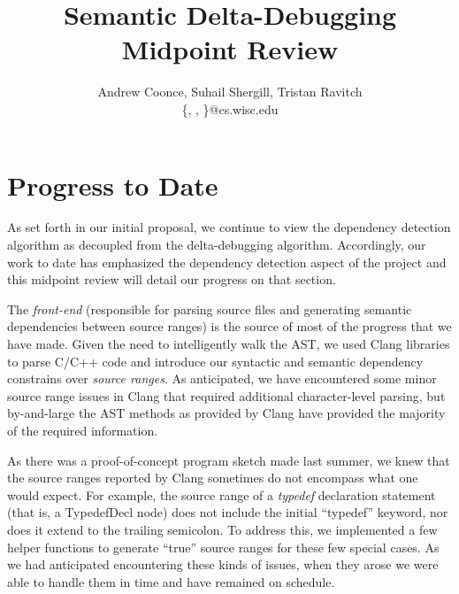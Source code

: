 \documentclass[11pt]{article}
\title{Semantic Delta-Debugging\\
Midpoint Review}
\author{Andrew Coonce, Suhail Shergill, Tristan Ravitch \\
\{\mailto{coonce}, \mailto{shergill}, \mailto{travitch}\}@cs.wisc.edu
}
\begin{document}
\maketitle

\section{Progress to Date}
As set forth in our initial proposal, we continue to view the dependency
detection algorithm as decoupled from the delta-debugging
algorithm. Accordingly, our work to date has emphasized the dependency detection
aspect of the project and this midpoint review will detail our progress on that
section.

The \emph{front-end} (responsible for parsing source files and generating
semantic dependencies between source ranges) is the source of most of the
progress that we have made. Given the need to intelligently walk the AST, we
used Clang \citep{clang} libraries to parse C/C++ code and introduce our
syntactic and semantic dependency constrains over \emph{source ranges}. As
anticipated, we have encountered some minor source range issues in Clang that
required additional character-level parsing, but by-and-large the AST methods as
provided by Clang have provided the majority of the required information.

As there was a proof-of-concept program sketch made last summer, we knew that
the source ranges reported by Clang sometimes do not encompass what one would
expect. For example, the source range of a \emph{typedef} declaration statement
(that is, a TypedefDecl node) does not include the initial ``typedef'' keyword,
nor does it extend to the trailing semicolon. To address this, we implemented a
few helper functions to generate ``true'' source ranges for these few special
cases. As we had anticipated encountering these kinds of issues, when they arose
we were able to handle them in time and have remained on schedule.
\end{document}
